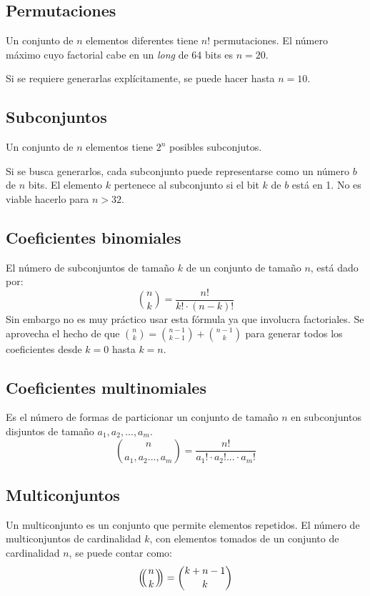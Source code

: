 \documentclass{article}
\def\multiset#1#2{\ensuremath{\left(\kern-.3em\left(\genfrac{}{}{0pt}{}{#1}{#2}\right)\kern-.3em\right)}}
\begin{document}
\begin{multicols}{2}
\subsection{Permutaciones}
Un conjunto de \( n \) elementos diferentes tiene \( n! \) permutaciones. El número máximo cuyo factorial cabe en un \emph{long} de 64 bits es \( n = 20 \).

Si se requiere generarlas explícitamente, se puede hacer hasta \( n = 10 \).



\subsection{Subconjuntos}
Un conjunto de \( n \) elementos tiene \( 2^{n} \) posibles subconjutos. 

Si se busca generarlos, cada subconjunto puede representarse como un número \( b \) de \( n \) bits. El elemento \( k \) pertenece al subconjunto si el bit \( k \) de \( b \) está en 1. No es viable hacerlo para \( n > 32 \).


\subsection{Coeficientes binomiales}
El número de subconjuntos de tamaño \( k \) de un conjunto de tamaño \( n \), está dado por:
\[ 
	\binom{n}{k} = \frac{n!}{k! \cdot (n-k)!} 
\]
Sin embargo no es muy práctico usar esta fórmula ya que involucra factoriales. Se aprovecha el hecho de que \( \binom{n}{k} = \binom{n-1}{k-1} + \binom{n-1}{k} \) para generar todos los coeficientes desde \( k = 0 \) hasta \( k = n \).


\subsection{Coeficientes multinomiales}
Es el número de formas de particionar un conjunto de tamaño \( n \) en subconjuntos disjuntos de tamaño \( a_1, a_2, ..., a_m \).
\[
\binom{n}{a_1,a_2 ..., a_m} = \frac{n!}{a_1! \cdot a_2! ... \cdot a_m!}
\]

\subsection{Multiconjuntos}
Un multiconjunto es un conjunto que permite elementos repetidos. El número de multiconjuntos de cardinalidad \( k \), con elementos tomados de un conjunto de cardinalidad \( n \), se puede contar como:
\[ \multiset{n}{k} = \binom{k+n-1}{k} \]


\end{multicols}
\end{document}
